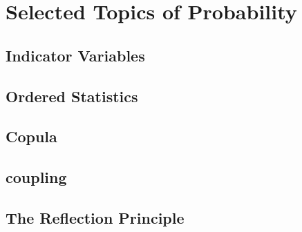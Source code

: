 \chapter{Selected Topics of Probability}
\section{Indicator Variables}
\section{Ordered Statistics}
\section{Copula}
\section{coupling}
\section{The Reflection Principle}

